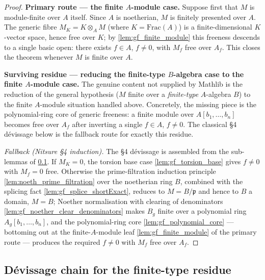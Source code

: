 \begin{proof}


\leanok
  \textbf{Primary route — the finite \(A\)-module case.}
  Suppose first that \(M\) is module-finite over \(A\) itself. Since \(A\) is noetherian,
  \(M\) is finitely presented over \(A\). The generic fibre \(M_K = K \otimes_A M\)
  (where \(K = \mathrm{Frac}(A)\)) is a finite-dimensional \(K\)-vector space, hence free
  over \(K\); by \cref{lem:gf_finite_module} this freeness descends to a single basic open:
  there exists \(f \in A\), \(f \ne 0\), with \(M_f\) free over \(A_f\). This closes the
  theorem whenever \(M\) is finite over \(A\).

  \textbf{Surviving residue — reducing the finite-type \(B\)-algebra case to the
  finite \(A\)-module case.} The genuine content not supplied by Mathlib is the
  reduction of the general hypothesis (\(M\) finite over a \emph{finite-type}
  \(A\)-algebra \(B\)) to the finite \(A\)-module situation handled above. Concretely,
  the missing piece is the polynomial-ring core of generic freeness: a finite module
  over \(A[b_1, \dots, b_n]\) becomes free over \(A_f\) after inverting a single
  \(f \in A\), \(f \ne 0\). The classical \S4 dévissage below is the fallback route
  for exactly this residue.

  \emph{Fallback (Nitsure \S4 induction).}
  The \S4 dévissage is assembled from the sub-lemmas of
  \cref{sec:gf_devissage_chain}. If \(M_K = 0\), the torsion base case
  \cref{lem:gf_torsion_base} gives \(f \ne 0\) with \(M_f = 0\) free. Otherwise the
  prime-filtration induction principle \cref{lem:noeth_prime_filtration} over the
  noetherian ring \(B\), combined with the splicing fact
  \cref{lem:gf_splice_shortExact}, reduces to \(M = B/\mathfrak{p}\) and hence to
  \(B\) a domain, \(M = B\); Noether normalisation with clearing of denominators
  \cref{lem:gf_noether_clear_denominators} makes \(B_g\) finite over a polynomial
  ring \(A_g[b_1, \dots, b_n]\), and the polynomial-ring core
  \cref{lem:gf_polynomial_core} — bottoming out at the finite-\(A\)-module leaf
  \cref{lem:gf_finite_module} of the primary route — produces the required
  \(f \ne 0\) with \(M_f\) free over \(A_f\).
\end{proof}

\subsection{Dévissage chain for the finite-type residue}
\label{sec:gf_devissage_chain}

